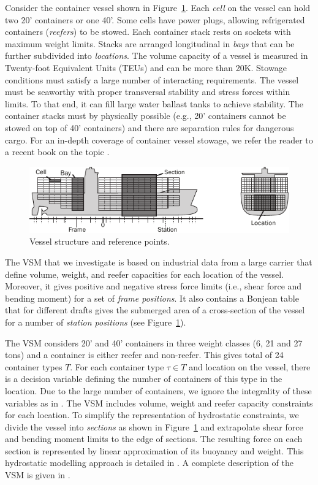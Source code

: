 \documentclass{llncs}
\begin{document}
Consider the container vessel shown in Figure~\ref{fig:vessel}. Each \emph{cell} on the vessel can hold two 20' containers or one 40'. Some cells have power plugs, allowing refrigerated containers (\emph{reefers}) to be stowed. Each container stack rests on sockets with maximum weight limits. Stacks are arranged longitudinal in \emph{bays} that can be further subdivided into \emph{locations}. The volume capacity of a vessel is measured in Twenty-foot Equivalent Units (TEUs) and can be more than 20K. Stowage conditions must satisfy a large number of interacting requirements. The vessel must be seaworthy with proper transversal stability and stress forces within limits. To that end, it can fill large water ballast tanks to achieve stability. The container stacks must by physically possible (e.g., 20' containers cannot be stowed on top of 40' containers) and there are separation rules for dangerous cargo. For an in-depth coverage of container vessel stowage, we refer the reader to a recent book on the topic \cite{JPAV18}.     

\begin{figure}[b!]
	\centering
		\includegraphics{figures/vessel4.pdf}
	\caption{Vessel structure and reference points.}
	\label{fig:vessel}
\end{figure}

The VSM that we investigate is based on industrial data from a large carrier that define volume, weight, and reefer capacities for each location of the vessel. Moreover, it gives positive and negative stress force limits (i.e., shear force and bending moment) for a set of \emph{frame positions}. It also contains a Bonjean table that for different drafts gives the submerged area of a cross-section of the vessel for a number of \emph{station positions} (see Figure~\ref{fig:vessel}). 

The VSM considers 20' and 40' containers in three weight classes (6, 21 and 27 tons) and a container is either reefer and non-reefer. This gives total of 24 container types $T$. For each container type $\tau \in T$ and location on the vessel, there is a decision variable defining the number of containers of this type in the location. Due to the large number of containers, we ignore the integrality of these variables as in \cite{pacino11}. The VSM includes volume, weight and reefer capacity constraints for each location. To simplify the representation of hydrostatic constraints, we divide the vessel into \emph{sections} as shown in Figure~\ref{fig:vessel} and extrapolate shear force and bending moment limits to the edge of sections. The resulting force on each section is represented by linear approximation of its buoyancy and weight. This hydrostatic modelling approach is detailed in \cite{ICCL18}. A complete description of the VSM is given in \cite{mytechrep}. 
\end{document}

